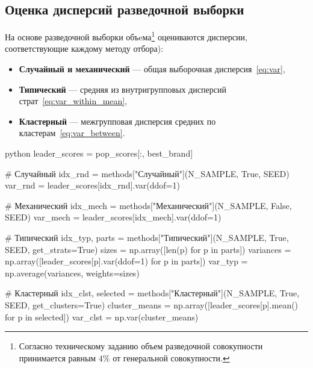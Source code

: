 \subsection{Оценка дисперсий разведочной выборки}

На основе разведочной выборки объeма\footnote{Согласно техническому заданию объем разведочной совокупности принимается равным $4\%$ от генеральной совокупности.} оцениваются дисперсии, соответствующие каждому методу отбора):

\begin{itemize}
    \item \textbf{Случайный и механический} --- общая выборочная дисперсия~\eqref{eq:var},
    \item \textbf{Типический} --- средняя из внутригрупповых дисперсий страт~\eqref{eq:var_within_mean},
    \item \textbf{Кластерный} --- межгрупповая дисперсия средних по кластерам~\eqref{eq:var_between}.
\end{itemize}

\begin{mintedbox}{python}
leader_scores = pop_scores[:, best_brand]

# Случайный
idx_rnd = methods["Случайный"](N_SAMPLE, True, SEED)
var_rnd = leader_scores[idx_rnd].var(ddof=1)

# Механический
idx_mech = methods["Механический"](N_SAMPLE, False, SEED)
var_mech = leader_scores[idx_mech].var(ddof=1)

# Типический
idx_typ, parts = methods["Типический"](N_SAMPLE, True, SEED, get_strats=True)
sizes = np.array([len(p) for p in parts])
variances = np.array([leader_scores[p].var(ddof=1) for p in parts])
var_typ = np.average(variances, weights=sizes)

# Кластерный
idx_clst, selected = methods["Кластерный"](N_SAMPLE, True, SEED, get_clusters=True)
cluster_means = np.array([leader_scores[p].mean() for p in selected])
var_clst = np.var(cluster_means)
\end{mintedbox}
